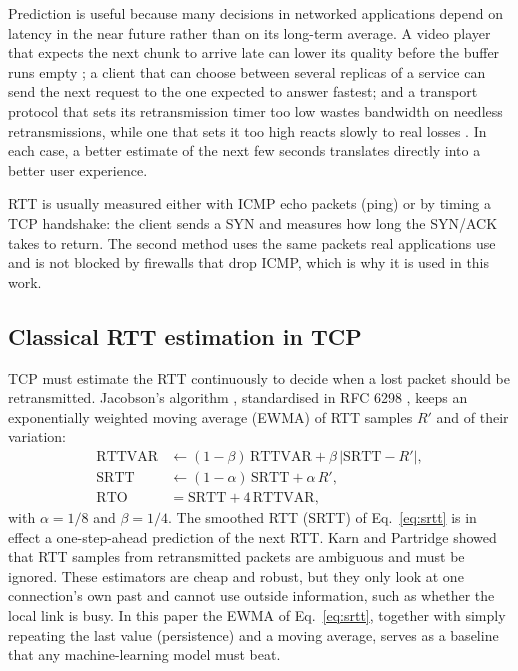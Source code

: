 \documentclass[pdflatex,sn-mathphys-num]{sn-jnl}
\begin{document}
Prediction is useful because many decisions in networked applications depend on latency in the near future rather than on its long-term average. A video player that expects the next chunk to arrive late can lower its quality before the buffer runs empty \cite{yan2020puffer,sun2016cs2p}; a client that can choose between several replicas of a service can send the next request to the one expected to answer fastest; and a transport protocol that sets its retransmission timer too low wastes bandwidth on needless retransmissions, while one that sets it too high reacts slowly to real losses \cite{rfc6298}. In each case, a better estimate of the next few seconds translates directly into a better user experience.

RTT is usually measured either with ICMP echo packets (ping) or by timing a TCP handshake: the client sends a SYN and measures how long the SYN/ACK takes to return. The second method uses the same packets real applications use and is not blocked by firewalls that drop ICMP, which is why it is used in this work.

\subsection{Classical RTT estimation in TCP}

TCP must estimate the RTT continuously to decide when a lost packet should be retransmitted. Jacobson's algorithm \cite{jacobson1988}, standardised in RFC 6298 \cite{rfc6298}, keeps an exponentially weighted moving average (EWMA) of RTT samples $R'$ and of their variation:
\begin{align}
\mathrm{RTTVAR} &\leftarrow (1-\beta)\,\mathrm{RTTVAR} + \beta\,\lvert \mathrm{SRTT} - R' \rvert, \label{eq:rttvar}\\
\mathrm{SRTT} &\leftarrow (1-\alpha)\,\mathrm{SRTT} + \alpha\,R', \label{eq:srtt}\\
\mathrm{RTO} &= \mathrm{SRTT} + 4\,\mathrm{RTTVAR}, \label{eq:rto}
\end{align}
with $\alpha = 1/8$ and $\beta = 1/4$. The smoothed RTT (SRTT) of Eq.~\ref{eq:srtt} is in effect a one-step-ahead prediction of the next RTT. Karn and Partridge \cite{karn1987} showed that RTT samples from retransmitted packets are ambiguous and must be ignored. These estimators are cheap and robust, but they only look at one connection's own past and cannot use outside information, such as whether the local link is busy. In this paper the EWMA of Eq.~\ref{eq:srtt}, together with simply repeating the last value (persistence) and a moving average, serves as a baseline that any machine-learning model must beat.
\end{document}
